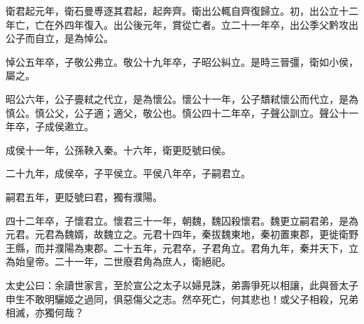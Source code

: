 \begin{pinyinscope}
衛君起元年，衛石曼尃逐其君起，起奔齊。衛出公輒自齊復歸立。初，出公立十二年亡，亡在外四年復入。出公後元年，賞從亡者。立二十一年卒，出公季父黔攻出公子而自立，是為悼公。

悼公五年卒，子敬公弗立。敬公十九年卒，子昭公糾立。是時三晉彊，衛如小侯，屬之。

昭公六年，公子亹弒之代立，是為懷公。懷公十一年，公子穨弒懷公而代立，是為慎公。慎公父，公子適；適父，敬公也。慎公四十二年卒，子聲公訓立。聲公十一年卒，子成侯遫立。

成侯十一年，公孫鞅入秦。十六年，衛更貶號曰侯。

二十九年，成侯卒，子平侯立。平侯八年卒，子嗣君立。

嗣君五年，更貶號曰君，獨有濮陽。

四十二年卒，子懷君立。懷君三十一年，朝魏，魏囚殺懷君。魏更立嗣君弟，是為元君。元君為魏婿，故魏立之。元君十四年，秦拔魏東地，秦初置東郡，更徙衛野王縣，而并濮陽為東郡。二十五年，元君卒，子君角立。君角九年，秦并天下，立為始皇帝。二十一年，二世廢君角為庶人，衛絕祀。

太史公曰：余讀世家言，至於宣公之太子以婦見誅，弟壽爭死以相讓，此與晉太子申生不敢明驪姬之過同，俱惡傷父之志。然卒死亡，何其悲也！或父子相殺，兄弟相滅，亦獨何哉？


\end{pinyinscope}